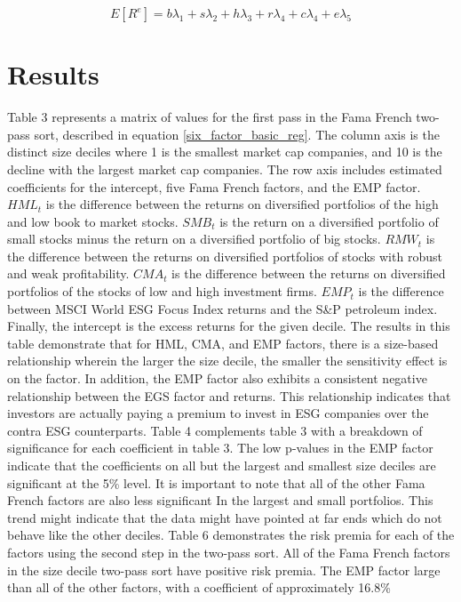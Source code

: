 \documentclass[12pt,oneside,reqno]{amsart}
\begin{document}
\begin{equation}
    E[R^e]= b\lambda_1+s\lambda_2 +h\lambda_3 +r\lambda_4 +c \lambda_4 + e\lambda_5
    \label{second_pass}
\end{equation}


\section{Results}
\label{Results}
Table 3 represents a matrix of values for the first pass in the Fama French two-pass sort, described in equation \eqref{six_factor_basic_reg}. The column axis is the distinct size deciles where 1 is the smallest market cap companies, and 10 is the decline with the largest market cap companies. The row axis includes estimated coefficients for the intercept, five Fama French factors, and the EMP factor. $HML_{t}$ is the difference between the returns on diversified portfolios of the high and low book to market stocks.  $SMB_{t}$ is the return on a diversified portfolio of small stocks minus the return on a diversified portfolio of big stocks. $RMW_t$ is the difference between the returns on diversified portfolios of stocks with robust and weak profitability. $CMA_{t}$ is the difference between the returns on diversified portfolios of the stocks of low and high investment firms. $EMP_t$ is the difference between MSCI World ESG Focus Index returns and the S\&P petroleum index. Finally, the intercept is the excess returns for the given decile. The results in this table demonstrate that for HML, CMA, and EMP factors, there is a size-based relationship wherein the larger the size decile, the smaller the sensitivity effect is on the factor. In addition, the EMP factor also exhibits a consistent negative relationship between the EGS factor and returns. This relationship indicates that investors are actually paying a premium to invest in ESG companies over the contra ESG counterparts. Table 4 complements table 3 with a breakdown of significance for each coefficient in table 3. The low p-values in the EMP factor indicate that the coefficients on all but the largest and smallest size deciles are significant at the 5\% level. It is important to note that all of the other Fama French factors are also less significant In the largest and small portfolios. This trend might indicate that the data might have pointed at far ends which do not behave like the other deciles.  Table 6 demonstrates the risk premia for each of the factors using the second step in the two-pass sort. All of the Fama French factors in the size decile two-pass sort have positive risk premia. The EMP factor large than all of the other factors, with a coefficient of approximately  16.8\%
\end{document}
